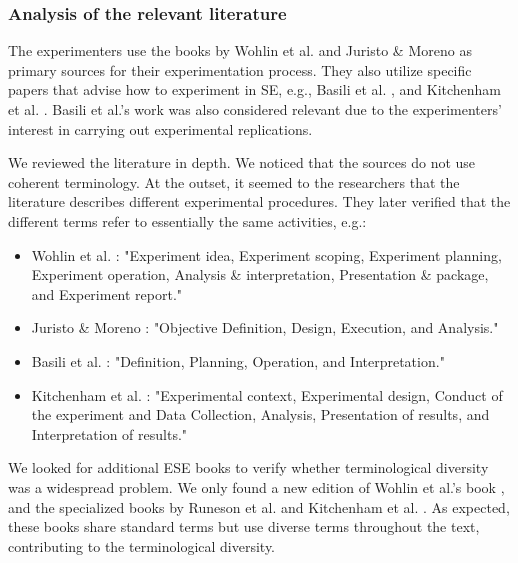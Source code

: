 \subsubsection{Analysis of the relevant literature}
The experimenters use the books by Wohlin et al. \cite{Wohlin-2000-Experimentation-SE} and Juristo \& Moreno \cite{Juristo-2001-SE-experimentation} as primary sources for their experimentation process. They also utilize specific papers that advise how to experiment in SE, e.g., Basili et al. \cite{Basili-1986-ESE}, and Kitchenham et al. \cite{Kitchenham-2002-empirical-research-guidelines-SE}. Basili et al.'s work \cite{Basili-1999-families-experiments} was also considered relevant due to the experimenters' interest in carrying out experimental replications.

We reviewed the literature in depth. We noticed that the sources do not use coherent terminology. At the outset, it seemed to the researchers that the literature describes different experimental procedures. They later verified that the different terms refer to essentially the same activities, e.g.:

\begin{itemize}
	\item Wohlin et al. \cite{Wohlin-2000-Experimentation-SE}: "Experiment idea, Experiment scoping, Experiment planning, Experiment operation, Analysis \& interpretation, Presentation \& package, and Experiment report."
	\item Juristo \& Moreno \cite{Juristo-2001-SE-experimentation}: "Objective Definition, Design, Execution, and Analysis."
	\item Basili et al. \cite{Basili-1986-ESE}: "Definition, Planning, Operation, and Interpretation."
	\item Kitchenham et al. \cite{Kitchenham-2002-empirical-research-guidelines-SE}: "Experimental context, Experimental design, Conduct of the experiment and Data Collection, Analysis, Presentation of results, and Interpretation of results."
\end{itemize}

We looked for additional ESE books to verify whether terminological diversity was a widespread problem. We only found a new edition of Wohlin et al.'s book \cite {Wohlin-2012-experimentatio-SE}, and the specialized books by Runeson et al. \cite{Runenson-2012-case-study-SE} and Kitchenham et al. \cite{Kitchenham-2015-Evidence-Based-SE}. As expected, these books share standard terms but use diverse terms throughout the text, contributing to the terminological diversity.


